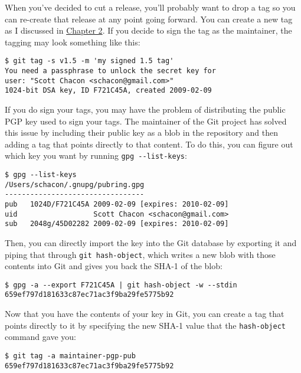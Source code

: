 \documentclass[a4paper]{book}
\newcounter{tab}[chapter]
\newcommand{\prechap}{Chapter }
\newcommand{\postchap}{}
\newcommand{\chapref}[1]{\hyperref[chap:#1]{\prechap #1\postchap}}
\begin{document}
When you've decided to cut a release, you'll probably want to drop a tag so you can re-create that release at any point going forward. You can create a new tag as I discussed in \chapref{2}. If you decide to sign the tag as the maintainer, the tagging may look something like this:

\begin{shaded}\begin{verbatim}
$ git tag -s v1.5 -m 'my signed 1.5 tag'
You need a passphrase to unlock the secret key for
user: "Scott Chacon <schacon@gmail.com>"
1024-bit DSA key, ID F721C45A, created 2009-02-09
\end{verbatim}\end{shaded}

If you do sign your tags, you may have the problem of distributing the public PGP key used to sign your tags. The maintainer of the Git project has solved this issue by including their public key as a blob in the repository and then adding a tag that points directly to that content. To do this, you can figure out which key you want by running \texttt{gpg -{}-list-keys}:

\begin{shaded}\begin{verbatim}
$ gpg --list-keys
/Users/schacon/.gnupg/pubring.gpg
---------------------------------
pub   1024D/F721C45A 2009-02-09 [expires: 2010-02-09]
uid                  Scott Chacon <schacon@gmail.com>
sub   2048g/45D02282 2009-02-09 [expires: 2010-02-09]
\end{verbatim}\end{shaded}

Then, you can directly import the key into the Git database by exporting it and piping that through \texttt{git hash-object}, which writes a new blob with those contents into Git and gives you back the SHA-1 of the blob:

\begin{shaded}\begin{verbatim}
$ gpg -a --export F721C45A | git hash-object -w --stdin
659ef797d181633c87ec71ac3f9ba29fe5775b92
\end{verbatim}\end{shaded}

Now that you have the contents of your key in Git, you can create a tag that points directly to it by specifying the new SHA-1 value that the \texttt{hash-object} command gave you:

\begin{shaded}\begin{verbatim}
$ git tag -a maintainer-pgp-pub 659ef797d181633c87ec71ac3f9ba29fe5775b92
\end{verbatim}\end{shaded}
\end{document}
